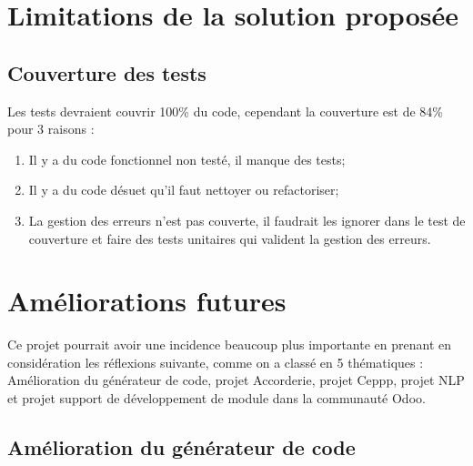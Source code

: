 \section{Limitations de la solution proposée}\label{sec:Limitations}

\subsection{Couverture des tests}
Les tests devraient couvrir 100\% du code, cependant la couverture est de 84\% pour 3 raisons :

\begin{enumerate}
    \item Il y a du code fonctionnel non testé, il manque des tests;
    \item Il y a du code désuet qu’il faut nettoyer ou refactoriser;
    \item La gestion des erreurs n’est pas couverte, il faudrait les ignorer dans le test de couverture et faire des tests unitaires qui valident la gestion des erreurs.
\end{enumerate}


\section{Améliorations futures}


Ce projet pourrait avoir une incidence beaucoup plus importante en prenant en considération les réflexions suivante, comme on a classé en 5 thématiques : Amélioration du générateur de code, projet Accorderie, projet Ceppp, projet NLP et projet support de développement de module dans la communauté Odoo.

\subsection{Amélioration du générateur de code}

